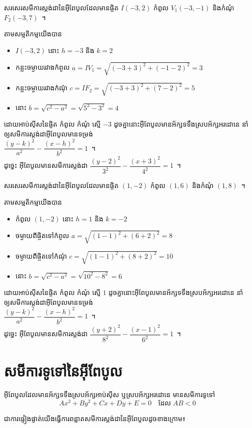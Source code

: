 %
\begin{example*}
	សរសេរសមីការស្តង់ដានៃអ៊ីពែបូលដែលមានផ្ចិត $ I(-3,2) $ កំពូល $ V_1(-3,-1) $ និងកំណុំ $ F_2(-3,7) $~។
\end{example*}
%
\begin{answer}
	តាមសម្មតិកម្មយើងបាន
	\begin{itemize}
		\item $ I(-3,2) $ នោះ $ h=-3 $ និង $ k=2 $
		\item កន្លះចម្ងាយរវាងកំពូល $ a=IV_1=\sqrt{(-3+3)^2+(-1-2)^2}=3 $
		\item កន្លះចម្ងាយរវាងកំណុំ $ c=IF_2=\sqrt{(-3+3)^2+(7-2)^2}=5 $
		\item នោះ $ b=\sqrt{c^2-a^2}=\sqrt{5^2-3^2}=4 $
	\end{itemize}
	ដោយអាប់ស៊ីសនៃផ្ចិត កំពូល កំណុំ ស្មើ $ -3 $ ដូចគ្នានោះអ៊ីពែបូលមានអ័ក្សទទឹងស្របអ័ក្សអរដោនេ នាំឲ្យសមីការស្តង់ដាអ៊ីពែបូលមានទម្រង់\\ $ \dfrac{(y-k)^2}{a^2}-\dfrac{(x-h)^2}{b^2}=1 $~។\\ ដូច្នេះ អ៊ីពែបូលមានសមីការស្តង់ដា $ \dfrac{(y-2)^2}{3^2}-\dfrac{(x+3)^2}{4^2}=1 $~។
\end{answer}
%
\begin{example*}
	សរសេរសមីការស្តង់ដានៃអ៊ីពែបូលដែលមានផ្ចិត $ (1,-2) $ កំពូល $ (1,6) $ និងកំណុំ $ (1,8) $~។
\end{example*}
%
\begin{answer}
	តាមសម្មតិកម្មយើងបាន
	\begin{itemize}
		\item កំពូល $ (1,-2) $ នោះ $ h=1 $ និង $ k=-2 $
		\item ចម្ងាយពីផ្ចិតទៅកំពូល $ a=\sqrt{(1-1)^2+(6+2)^2}=8 $
		\item ចម្ងាយពីផ្ចិតទៅកំណុំ $ c=\sqrt{(1-1)^2+(8+2)^2}=10 $
		\item នោះ $ b=\sqrt{c^2-a^2}=\sqrt{10^2-8^2}=6 $
	\end{itemize}
	ដោយអាប់ស៊ីសនៃផ្ចិត កំពូល កំណុំ ស្មើ $ 1 $ ដូចគ្នានោះអ៊ីពែបូលមានអ័ក្សទទឹងស្របអ័ក្សអរដោនេ នាំឲ្យសមីការស្តង់ដាអ៊ីពែបូលមានទម្រង់\\ $ \dfrac{(y-k)^2}{a^2}-\dfrac{(x-h)^2}{b^2}=1 $~។\\ ដូច្នេះ អ៊ីពែបូលមានសមីការស្តង់ដា $ \dfrac{(y+2)^2}{8^2}-\dfrac{(x-1)^2}{6^2}=1 $~។
\end{answer}
%
\section{សមីការទូទៅនៃអ៊ីពែបូល}
%
\begin{proposition*}
	អ៊ីពែបូលដែលមានអ័ក្សទទឹងស្របអ័ក្សអាប់ស៊ីស ឬស្របអ័ក្សអរដោនេ មានសមីការទូទៅ
	\begin{equation}
		Ax^2+By^2+Cx+Dy+E=0\quad\text{ដែល}\; AB<0
	\end{equation}
\end{proposition*}
%
\noindent ជាការផ្ទៀងផ្ទាត់យើងធ្វើការពន្លាតសមីការស្តង់ដានៃអ៊ីពែបូលដូចខាងក្រោម៖
%
